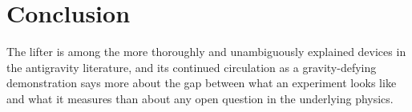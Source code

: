 \documentclass[11pt]{article}
\begin{document}
\section{Conclusion}

The lifter is among the more thoroughly and unambiguously explained devices in the antigravity literature, and its continued circulation as a gravity-defying demonstration says more about the gap between what an experiment looks like and what it measures than about any open question in the underlying physics.
\end{document}

